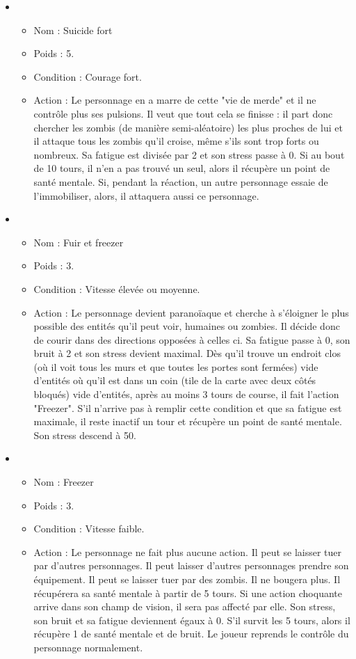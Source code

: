 \begin{itemize}
\begin{itemize}
   \end{itemize}
      \item \begin{itemize}
   		\item Nom : Suicide fort
   		\item Poids : 5.
   	 	\item Condition : Courage fort.
   	 	\item Action : Le personnage en a marre de cette "vie de merde" et il ne contrôle plus ses pulsions. Il veut que tout cela se finisse : il part donc chercher les zombis (de manière semi-aléatoire) les plus proches de lui et il attaque tous les zombis qu'il croise, même s'ils sont trop forts ou nombreux. Sa fatigue est divisée par 2 et son stress passe à 0. Si au bout de 10 tours, il n'en a pas trouvé un seul, alors il récupère un point de santé mentale. Si, pendant la réaction, un autre personnage essaie de l'immobiliser, alors, il attaquera aussi ce personnage.
   \end{itemize}
   \item \begin{itemize}
   		\item Nom : Fuir et freezer
   		\item Poids : 3.
   	 	\item Condition : Vitesse élevée ou moyenne.
   	 	\item Action : Le personnage devient paranoïaque et cherche à s'éloigner le plus possible des entités qu'il peut voir, humaines ou zombies. Il décide donc de courir dans des directions opposées à celles ci. Sa fatigue passe à 0, son bruit à 2 et son stress devient maximal. Dès qu'il trouve un endroit clos (où il voit tous les murs et que toutes les portes sont fermées) vide d'entités où qu'il est dans un coin (tile de la carte avec deux côtés bloqués) vide d'entités, après au moins 3 tours de course, il fait l'action "Freezer". S'il n'arrive pas à remplir cette condition et que sa fatigue est maximale, il reste inactif un tour et récupère un point de santé mentale. Son stress descend à 50.
   \end{itemize}
   \item \begin{itemize}
   		\item Nom : Freezer
   		\item Poids : 3.
   	 	\item Condition : Vitesse faible.
   	 	\item Action : Le personnage ne fait plus aucune action. Il peut se laisser tuer par d'autres personnages. Il peut laisser d'autres personnages prendre son équipement. Il peut se laisser tuer par des zombis. Il ne bougera plus. Il récupérera sa santé mentale à partir de 5 tours. Si une action choquante arrive dans son champ de vision, il sera pas affecté par elle. Son stress, son bruit et sa fatigue deviennent égaux à 0. S'il survit les 5 tours, alors il récupère 1 de santé mentale et de bruit. Le joueur reprends le contrôle du personnage normalement.

\end{itemize}
\end{itemize}
